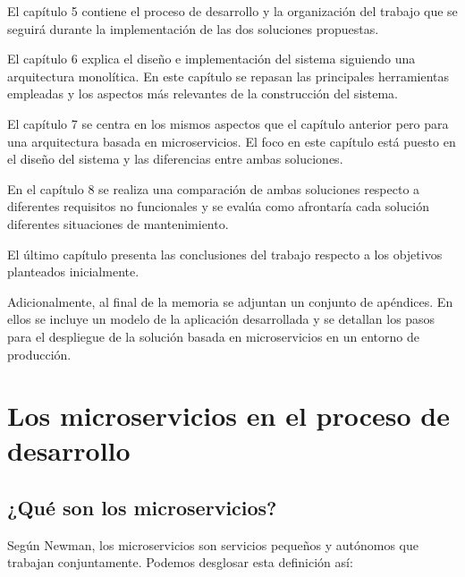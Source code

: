 \documentclass[11pt,spanish,listoffigures]{tfgetsinf}
\begin{document}
El capítulo 5 contiene el proceso de desarrollo y la organización del trabajo que se seguirá durante la implementación de las dos soluciones propuestas.

El capítulo 6 explica el diseño e implementación del sistema siguiendo una arquitectura monolítica. En este capítulo se repasan las principales herramientas empleadas y los aspectos más relevantes de la construcción del sistema.

El capítulo 7 se centra en los mismos aspectos que el capítulo anterior pero para una arquitectura basada en microservicios. El foco en este capítulo está puesto en el diseño del sistema y las diferencias entre ambas soluciones.

En el capítulo 8 se realiza una comparación de ambas soluciones respecto a diferentes requisitos no funcionales  y se evalúa como afrontaría cada solución diferentes situaciones de mantenimiento.

El último capítulo presenta las conclusiones del trabajo respecto a los objetivos planteados inicialmente.

Adicionalmente, al final de la memoria se adjuntan un conjunto de apéndices. En ellos  se incluye un modelo de la aplicación desarrollada y se detallan los pasos para el despliegue de la solución basada en microservicios en un entorno de producción.

%

\chapter{Los microservicios en el proceso de desarrollo}

\section{¿Qué son los microservicios?}

Según Newman, \cite{Newman2015a} los microservicios son servicios pequeños y autónomos que trabajan conjuntamente. Podemos desglosar esta definición así:
\end{document}
